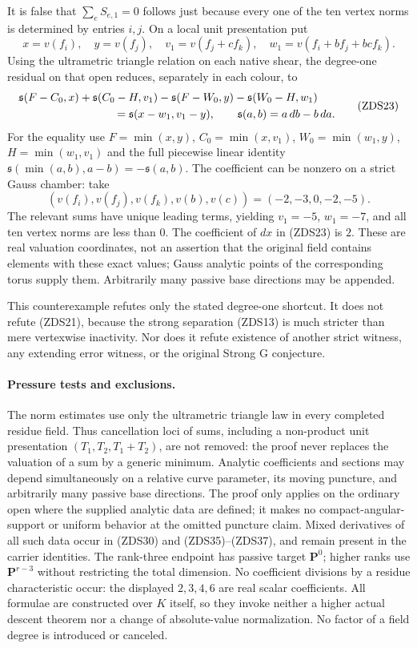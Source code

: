 It is false that $\sum_eS_{e,1}=0$ follows just because every one
of the ten vertex norms is determined by entries $i,j$.  On a
local unit presentation put
\[
 x=v(f_i),\quad y=v(f_j),\quad v_1=v(f_j+cf_k),\quad
 w_1=v(f_i+bf_j+bcf_k).
 \tag{ZDS22}
\]
Using the ultrametric triangle relation on each native shear,
the degree-one residual on that open reduces, separately in each
colour, to
\[
 \begin{split}
 &\mathfrak s(F-C_0,x)+\mathfrak s(C_0-H,v_1)
   -\mathfrak s(F-W_0,y)-\mathfrak s(W_0-H,w_1)\\
 &\hspace{30mm}=\mathfrak s(x-w_1,v_1-y),
 \qquad\mathfrak s(a,b)=a\,db-b\,da.
 \end{split}
 \tag{ZDS23}
\]
For the equality use $F=\min(x,y)$, $C_0=\min(x,v_1)$,
$W_0=\min(w_1,y)$, $H=\min(w_1,v_1)$ and the full piecewise
linear identity
$\mathfrak s(\min(a,b),a-b)=-\mathfrak s(a,b)$.
The coefficient can be nonzero on a strict Gauss chamber: take
\[
 (v(f_i),v(f_j),v(f_k),v(b),v(c))=(-2,-3,0,-2,-5).
 \tag{ZDS24}
\]
The relevant sums have unique leading terms, yielding
$v_1=-5$, $w_1=-7$, and all ten vertex norms are less than $0$.
The coefficient of $dx$ in (ZDS23) is $2$.  These are real
valuation coordinates, not an assertion that the original field
contains elements with these exact values; Gauss analytic points
of the corresponding torus supply them.  Arbitrarily many
passive base directions may be appended.

This counterexample refutes only the stated degree-one shortcut.
It does not refute (ZDS21), because the strong separation
(ZDS13) is much stricter than mere vertexwise inactivity.  Nor
does it refute existence of another strict witness, any extending
error witness, or the original Strong G conjecture.

\paragraph{Pressure tests and exclusions.}
The norm estimates use only the ultrametric triangle law in every
completed residue field.  Thus cancellation loci of sums, including
a non-product unit presentation $(T_1,T_2,T_1+T_2)$, are not removed:
the proof never replaces the valuation of a sum by a generic minimum.
Analytic coefficients and sections may depend simultaneously on a
relative curve parameter, its moving puncture, and arbitrarily many
passive base directions.  The proof only applies on the ordinary
open where the supplied analytic data are defined; it makes no
compact-angular-support or uniform behavior at the omitted puncture
claim.  Mixed derivatives of all such data occur in (ZDS30) and
(ZDS35)--(ZDS37), and remain present in the carrier identities.
The rank-three endpoint has passive target $\mathbf P^0$; higher
ranks use $\mathbf P^{r-3}$ without restricting the total dimension.
No coefficient divisions by a residue characteristic occur: the
displayed $2,3,4,6$ are real scalar coefficients.  All formulae
are constructed over $K$ itself, so they invoke neither a higher
actual descent theorem nor a change of absolute-value normalization.
No factor of a field degree is introduced or canceled.

